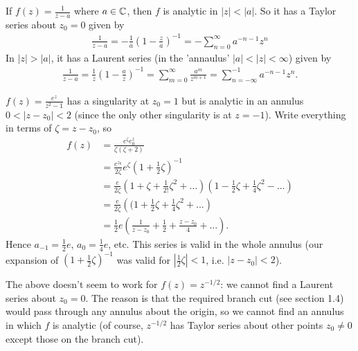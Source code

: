 \documentclass[a4paper]{article}
\begin{document}
\begin{eg}
If $f(z) = \frac{1}{z-a}$ where $a\in \mathbb{C}$, then $f$ is analytic in $|z| < |a|$. So it has a Taylor series about $z_0=0$ given by
\begin{equation*}
\begin{aligned}
\frac{1}{z-a} = -\frac{1}{a}(1-\frac{z}{a})^{-1}= -\sum_{n=0}^\infty a^{-n-1} z^n
\end{aligned}
\end{equation*}
In $|z|>|a|$, it has a Laurent series (in the 'annaulus' $|a|<|z|<\infty$) given by
\begin{equation*}
\begin{aligned}
\frac{1}{z-a} = \frac{1}{z} (1-\frac{a}{z})^{-1} = \sum_{m=0}^\infty \frac{a^m}{z^{m+1}} =\sum_{n=-\infty}^{-1} a^{-n-1}z^n.
\end{aligned}
\end{equation*}
\end{eg}

\begin{eg}
$f(z) = \frac{e^z}{z^2-1}$ has a singularity at $z_0=1$ but is analytic in an annulus $0<|z-z_0|<2$ (since the only other singularity is at $z=-1$). Write everything in terms of $\zeta = z-z_0$, so
\begin{equation*}
\begin{aligned}
f(z) &= \frac{e^{\zeta}e^z_0}{\zeta(\zeta+2)}\\
&=\frac{e^{z_0}}{2\zeta} e^\zeta \left(1+\frac{1}{2}\zeta\right)^{-1}\\
&= \frac{e}{2\zeta} \left(1+\zeta+\frac{1}{2!}\zeta^2+...\right) \left(1-\frac{1}{2}\zeta + \frac{1}{4} \zeta^2-...\right)\\
&= \frac{e}{2\zeta} \left((1+\frac{1}{2}\zeta+\frac{1}{4}\zeta^2+...\right)\\
&=\frac{1}{2} e \left(\frac{1}{z-z_0} + \frac{1}{2} + \frac{z-z_0}{4}+...\right).
\end{aligned}
\end{equation*}
Hence $a_{-1} = \frac{1}{2} e$, $a_0 = \frac{1}{4}e$, etc. This series is valid in the whole annulus (our expansion of $(1+\frac{1}{2}\zeta)^{-1}$ was valid for $|\frac{1}{2}\zeta|<1$, i.e. $|z-z_0|<2$).
\end{eg}

\begin{eg}
The above doesn't seem to work for $f(z) = z^{-1/2}$: we cannot find a Laurent series about $z_0=0$. The reason is that the required branch cut (see section 1.4) would pass through any annulus about the origin, so we cannot find an annulus in which $f$ is analytic (of course, $z^{-1/2}$ has Taylor series about other points $z_0 \neq 0$ except those on the branch cut).
\end{eg}
\end{document}
